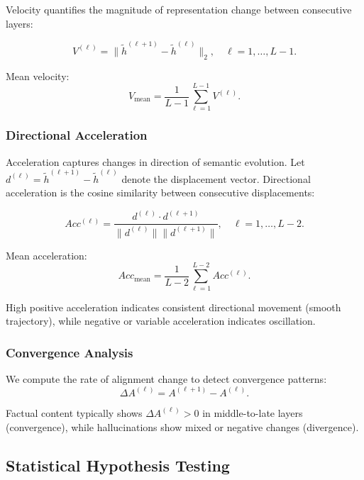\documentclass[11pt]{article}
\begin{document}
Velocity quantifies the magnitude of representation change between consecutive layers:

\begin{equation}
V^{(\ell)} = \|\tilde{h}^{(\ell+1)} - \tilde{h}^{(\ell)}\|_2, \quad \ell = 1, \ldots, L-1.
\label{eq:velocity}
\end{equation}

Mean velocity:
\begin{equation}
V_{\text{mean}} = \frac{1}{L-1} \sum_{\ell=1}^{L-1} V^{(\ell)}.
\end{equation}

\subsubsection{Directional Acceleration}

Acceleration captures changes in direction of semantic evolution. Let $d^{(\ell)} = \tilde{h}^{(\ell+1)} - \tilde{h}^{(\ell)}$ denote the displacement vector. Directional acceleration is the cosine similarity between consecutive displacements:

\begin{equation}
Acc^{(\ell)} = \frac{d^{(\ell)} \cdot d^{(\ell+1)}}{\|d^{(\ell)}\| \|d^{(\ell+1)}\|}, \quad \ell = 1, \ldots, L-2.
\label{eq:acceleration}
\end{equation}

Mean acceleration:
\begin{equation}
Acc_{\text{mean}} = \frac{1}{L-2} \sum_{\ell=1}^{L-2} Acc^{(\ell)}.
\end{equation}

High positive acceleration indicates consistent directional movement (smooth trajectory), while negative or variable acceleration indicates oscillation.

\subsubsection{Convergence Analysis}

We compute the rate of alignment change to detect convergence patterns:
\begin{equation}
\Delta A^{(\ell)} = A^{(\ell+1)} - A^{(\ell)}.
\end{equation}

Factual content typically shows $\Delta A^{(\ell)} > 0$ in middle-to-late layers (convergence), while hallucinations show mixed or negative changes (divergence).

\subsection{Statistical Hypothesis Testing}
\end{document}

